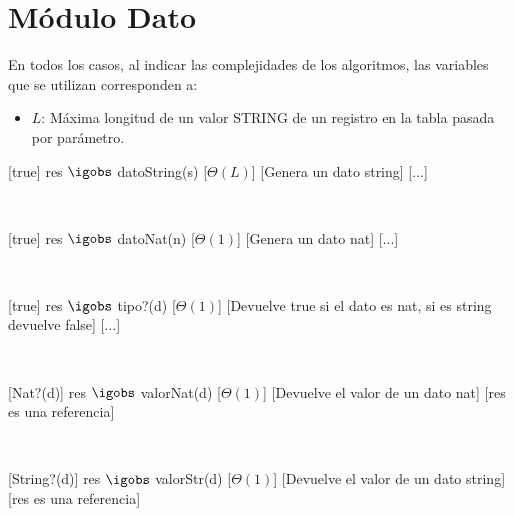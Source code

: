 \section{M\'odulo Dato}


  En todos los casos, al indicar las complejidades de los algoritmos, las variables que se utilizan corresponden a:
  \vspace{-0.5em}\begin{itemize}
    \item $L$: M\'axima longitud de un valor STRING de un registro en la tabla pasada por par\'ametro.
  \end{itemize}


\begin{Interfaz}
  


  

  [true] %
  {res $\igobs$ datoString(s)} %
  [$\Theta(L)$] %
  [Genera un dato string] %
  [...] %

  ~

  [true] %
  {res $\igobs$ datoNat(n)} %
  [$\Theta(1)$] %
  [Genera un dato nat] %
  [...] %

  ~
  
  [true] %
  {res $\igobs$ tipo?(d)} %
  [$\Theta(1)$] %
  [Devuelve true si el dato es nat, si es string devuelve false] %
  [...] %

  ~

  [Nat?(d)] %
  {res $\igobs$ valorNat(d)} %
  [$\Theta(1)$] %
  [Devuelve el valor de un dato nat] %
  [res es una referencia] %

  ~
  
  [String?(d)] %
  {res $\igobs$ valorStr(d)} %
  [$\Theta(1)$] %
  [Devuelve el valor de un dato string] %
  [res es una referencia] %
  
  ~
  
\newpage  


\end{Interfaz}
